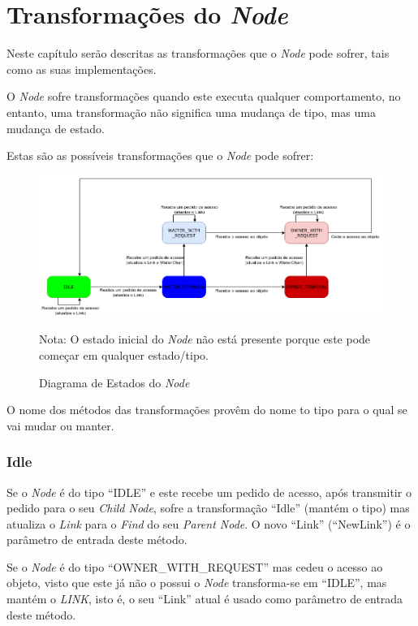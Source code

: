 \section{Transformações do \emph{Node}}



Neste capítulo serão descritas as transformações que o \emph{Node}
pode sofrer, tais como as suas implementações.


O \emph{Node} sofre transformações quando este executa qualquer comportamento, 
no entanto, uma transformação não significa uma mudança de tipo,
mas uma mudança de estado.

Estas são as possíveis transformações que o \emph{Node} pode sofrer:

\begin{figure}[!htb]
\centering
\includegraphics[width=500pt]{state-diagram.png}
\caption{Diagrama de Estados do \emph{Node}}
Nota: O estado inicial do \emph{Node} não está presente porque este pode começar em qualquer estado/tipo.
\end{figure}


O nome dos métodos das transformações provêm do nome to tipo 
para o qual se vai mudar ou manter.


\subsubsection*{Idle}
Se o \emph{Node} é do tipo ``IDLE'' e este recebe um pedido de acesso, após transmitir
o pedido para o seu \emph{Child Node}, sofre a transformação ``Idle'' (mantém o tipo) mas atualiza o \emph{Link} para o \emph{Find} do seu \emph{Parent Node}.
O novo ``Link'' (``NewLink'') é o parâmetro de entrada deste método.

Se o \emph{Node} é do tipo ``OWNER\_WITH\_REQUEST'' mas cedeu o acesso ao objeto, visto que este já não o possui o \emph{Node}
transforma-se em ``IDLE'', mas mantém o \emph{LINK}, isto é, o seu ``Link'' atual é usado como
parâmetro de entrada deste método.

